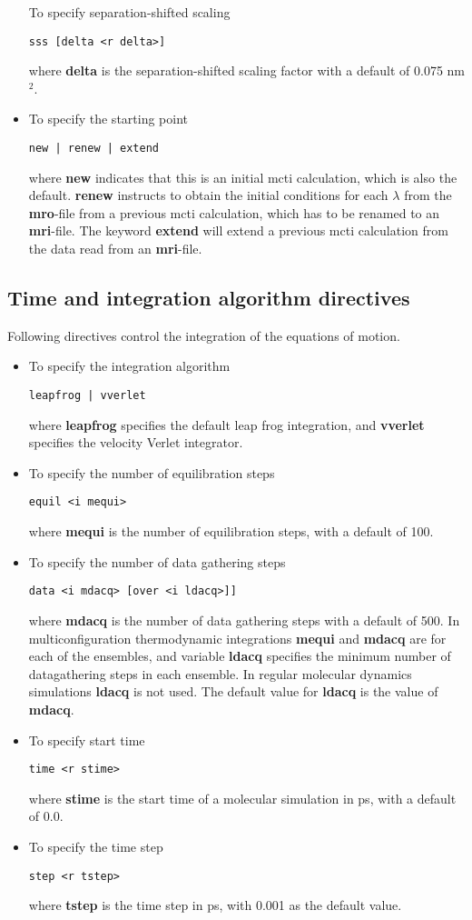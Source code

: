 \begin{itemize}
To specify separation-shifted scaling
\begin{verbatim}
sss [delta <r delta>]
\end{verbatim}
where {\bf delta} is the separation-shifted scaling factor with a default
of 0.075 nm$^2$.
\item
To specify the starting point
\begin{verbatim}
new | renew | extend
\end{verbatim}
where {\bf new} indicates that this is an initial mcti calculation, which
is also the default. {\bf renew} instructs to obtain the initial
conditions for each $\lambda$ from the {\bf mro}-file from a previous 
mcti calculation, which has to be renamed to an {\bf mri}-file. The
keyword {\bf extend} will extend a previous mcti calculation from the
data read from an {\bf mri}-file.
\end{itemize}
\subsection{Time and integration algorithm directives}
Following directives control the integration of the equations of motion.
\begin{itemize}
\item
To specify the integration algorithm
\begin{verbatim}
leapfrog | vverlet
\end{verbatim}
where {\bf leapfrog} specifies the default leap frog integration, and
{\bf vverlet} specifies the velocity Verlet integrator.
\item
To specify the number of equilibration steps
\begin{verbatim}
equil <i mequi>
\end{verbatim}
where {\bf mequi} is the number of equilibration steps, with a default
of 100.
\item
To specify the number of data gathering steps
\begin{verbatim}
data <i mdacq> [over <i ldacq>]]
\end{verbatim}
where {\bf mdacq} is the number of data gathering steps with a
default of 500. In multiconfiguration thermodynamic integrations
{\bf mequi} and {\bf mdacq} are for each of the ensembles, and
variable {\bf ldacq} specifies the minimum number of datagathering steps 
in each ensemble. In regular molecular dynamics simulations {\bf ldacq}
is not used. The default value for {\bf ldacq} is the value of {\bf mdacq}.
\item
To specify start time
\begin{verbatim}
time <r stime>
\end{verbatim}
where {\bf stime} is the start time of a molecular simulation in ps,
with a default of 0.0.
\item
To specify the time step
\begin{verbatim}
step <r tstep>
\end{verbatim}
where {\bf tstep} is the time step in ps, with 0.001 as the default value.
\end{itemize}
